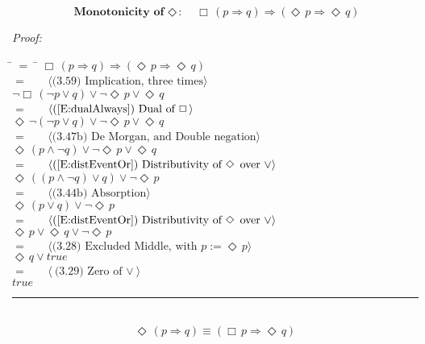\documentclass[fleqn, leqno]{article}
\newcommand{\lgap}{2pt} %
\newcommand{\mymathindent}{24pt} %
\newcommand{\Event}{\Diamond\,}
\newcommand{\Always}{\Box\,}
\newcommand{\myqed}{\hfill\rule[-.23ex]{1.2ex}{2.0ex}}
\newcommand{\Gll} {\langle} %
\newcommand{\Ggg} {\rangle} %
\newcommand{\Hint}[1] {\ \ \ $\Gll \mbox{#1} \Ggg$ } %
\begin{document}
\begin{equation}\label{E:alwaysImpEvents}
\textbf{Monotonicity of $\Event$:}\quad \Always (p \Rightarrow q) \Rightarrow (\Event p \Rightarrow \Event q)
\end{equation}

\emph{Proof:}
\begin{tabbing}
\hspace{\mymathindent} \= $= \;$ \= \kill
\> \> $\Always (p \Rightarrow q) \Rightarrow (\Event p \Rightarrow \Event q)$\\[\lgap]
\> $=$ \> \Hint{(3.59) Implication, three times}\\[\lgap]
\> \> $\lnot\Always (\lnot p \lor q) \lor \lnot\Event p \lor \Event q$\\[\lgap]
\> $=$ \> \Hint{(\ref{E:dualAlways}) Dual of $\Always$}\\[\lgap]
\> \> $\Event\lnot (\lnot p \lor q) \lor \lnot\Event p \lor \Event q$\\[\lgap]
\> $=$ \> \Hint{(3.47b) De Morgan, and Double negation}\\[\lgap]
\> \> $\Event(p \land \lnot q) \lor \lnot\Event p \lor \Event q$\\[\lgap]
\> $=$ \> \Hint{(\ref{E:distEventOr}) Distributivity of $\Event$ over $\lor$}\\[\lgap]
\> \> $\Event((p \land \lnot q) \lor q) \lor \lnot\Event p$\\[\lgap]
\> $=$ \> \Hint{(3.44b) Absorption}\\[\lgap]
\> \> $\Event(p \lor q) \lor \lnot\Event p$\\[\lgap]
\> $=$ \> \Hint{(\ref{E:distEventOr}) Distributivity of $\Event$ over $\lor$}\\[\lgap]
\> \> $\Event p \lor \Event q \lor \lnot\Event p$\\[\lgap]
\> $=$ \> \Hint{(3.28) Excluded Middle, with $p := \Event p$}\\[\lgap]
\> \> $\Event q \lor true$\\[\lgap]
\> $=$ \> \Hint{(3.29) Zero of $\lor$}\\[\lgap]
\> \> $true$\\[\lgap]
\end{tabbing}
\myqed\\[\lgap]


\begin{equation}\label{E:eventImpAlways}
\Event (p \Rightarrow q) \equiv (\Always p \Rightarrow \Event q)
\end{equation}
\end{document}
